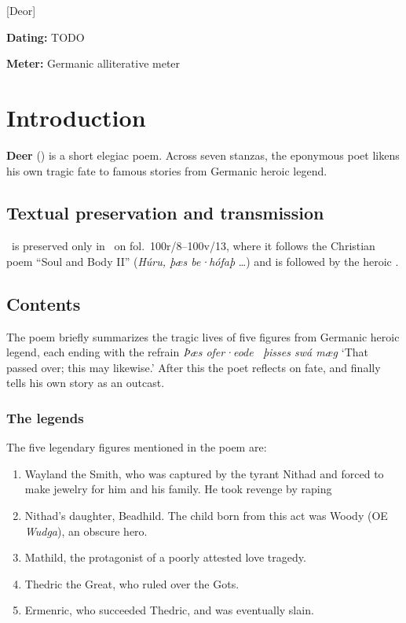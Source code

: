 [Deor]

\begin{flushright}%
\textbf{Dating:} TODO

\textbf{Meter:} Germanic alliterative meter
\end{flushright}%

\section{Introduction}

\textbf{Deer} (\Deor) is a short elegiac poem.  Across seven stanzas, the eponymous poet likens his own tragic fate to famous stories from Germanic heroic legend.

\subsection{Textual preservation and transmission}

\Deor\ is preserved only in \ExeterBook\ on fol.~100r/8--100v/13, where it follows the Christian poem “Soul and Body II” (\emph{Húru, þæs be·hófaþ} \dots) and is followed by the heroic .

\subsection{Contents}

The poem briefly summarizes the tragic lives of five figures from Germanic heroic legend, each ending with the refrain \emph{Þæs ofer·eode \hld\ þisses swá mæg} ‘That passed over; this may likewise.’  After this the poet reflects on fate, and finally tells his own story as an outcast.

\subsubsection{The legends}

The five legendary figures mentioned in the poem are:

\begin{enumerate}
  \item Wayland the Smith, who was captured by the tyrant Nithad and forced to make jewelry for him and his family. He took revenge by raping
  \item Nithad’s daughter, Beadhild. The child born from this act was Woody (OE \emph{Wudga}), an obscure hero.
  \item Mathild, the protagonist of a poorly attested love tragedy.
  \item Thedric the Great, who ruled over the Gots.
  \item Ermenric, who succeeded Thedric, and was eventually slain.
\end{enumerate}

